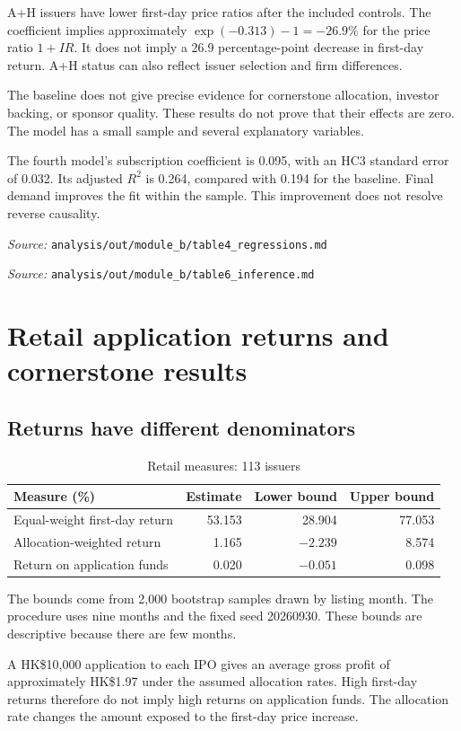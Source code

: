 \documentclass[11pt,a4paper]{article}
\newcommand{\src}[1]{\par{\footnotesize\textit{Source:} \nolinkurl{#1}}}
\begin{document}
A+H issuers have lower first-day price ratios after the included controls.
The coefficient implies approximately $\exp(-0.313)-1=-26.9\%$ for the price ratio $1+IR$.
It does not imply a 26.9 percentage-point decrease in first-day return.
A+H status can also reflect issuer selection and firm differences.

The baseline does not give precise evidence for cornerstone allocation, investor backing, or sponsor quality.
These results do not prove that their effects are zero.
The model has a small sample and several explanatory variables.

The fourth model's subscription coefficient is 0.095, with an HC3 standard error of 0.032.
Its adjusted $R^2$ is 0.264, compared with 0.194 for the baseline.
Final demand improves the fit within the sample.
This improvement does not resolve reverse causality.
\src{analysis/out/module_b/table4_regressions.md}
\src{analysis/out/module_b/table6_inference.md}

\newpage
\section{Retail application returns and cornerstone results}
\subsection{Returns have different denominators}
\begin{table}[h]
\centering
\caption{Retail measures: 113 issuers}
\begin{tabular}{lrrr}
\toprule
Measure (\%) & Estimate & Lower bound & Upper bound\\
\midrule
Equal-weight first-day return & 53.153 & 28.904 & 77.053\\
Allocation-weighted return & 1.165 & $-2.239$ & 8.574\\
Return on application funds & 0.020 & $-0.051$ & 0.098\\
\bottomrule
\end{tabular}
\end{table}

The bounds come from 2,000 bootstrap samples drawn by listing month.
The procedure uses nine months and the fixed seed 20260930.
These bounds are descriptive because there are few months.

A HK\$10,000 application to each IPO gives an average gross profit of approximately HK\$1.97 under the assumed allocation rates.
High first-day returns therefore do not imply high returns on application funds.
The allocation rate changes the amount exposed to the first-day price increase.
\end{document}
